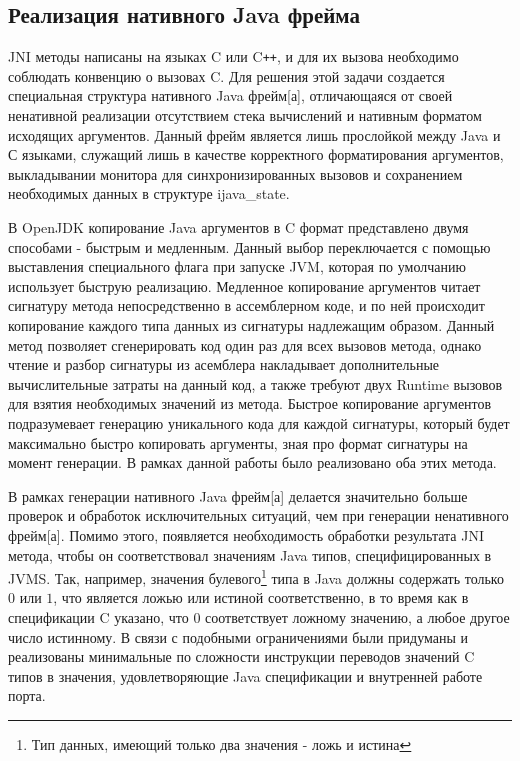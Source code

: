 \subsection{Реализация нативного Java фрейма}
JNI \gls{метод}ы написаны на языках C или C\texttt{++}, и для их вызова необходимо соблюдать конвенцию о вызовах C. Для решения этой задачи создается специальная структура нативного Java \gls{фрейм}[а], отличающаяся от своей ненативной реализации отсутствием стека вычислений и нативным форматом исходящих аргументов. Данный \gls{фрейм} является лишь прослойкой между Java и С языками, служащий лишь в качестве корректного форматирования аргументов, выкладывании монитора для синхронизированных вызовов и сохранением необходимых данных в структуре ijava\_state.




В OpenJDK копирование Java аргументов в C формат представлено двумя способами - быстрым и медленным. Данный выбор переключается с помощью выставления специального флага при запуске JVM, которая по умолчанию использует быструю реализацию. Медленное копирование аргументов читает сигнатуру \gls{метод}а непосредственно в ассемблерном коде, и по ней происходит копирование каждого типа данных из сигнатуры надлежащим образом. Данный \gls{метод} позволяет сгенерировать код один раз для всех вызовов \gls{метод}а, однако чтение и разбор сигнатуры из асемблера накладывает дополнительные вычислительные затраты на данный код, а также требуют двух Runtime вызовов для взятия необходимых значений из \gls{метод}а. Быстрое копирование аргументов подразумевает генерацию уникального кода для каждой сигнатуры, который будет максимально быстро копировать аргументы, зная про формат сигнатуры на момент генерации. В рамках данной работы было реализовано оба этих \gls{метод}а.

В рамках генерации нативного Java \gls{фрейм}[а] делается значительно больше проверок и обработок исключительных ситуаций, чем при генерации ненативного \gls{фрейм}[а]. Помимо этого, появляется необходимость обработки результата JNI \gls{метод}а, чтобы он соответствовал значениям Java типов, специфицированных в JVMS. Так, например, значения булевого\footnote{Тип данных, имеющий только два значения - ложь и истина} типа в Java должны содержать только $0$ или $1$, что является ложью или истиной соответственно, в то время как в спецификации C указано, что $0$ соответствует ложному значению, а любое другое число истинному. В связи с подобными ограничениями были придуманы и реализованы минимальные по сложности инструкции переводов значений C типов в значения, удовлетворяющие Java спецификации и внутренней работе порта.



